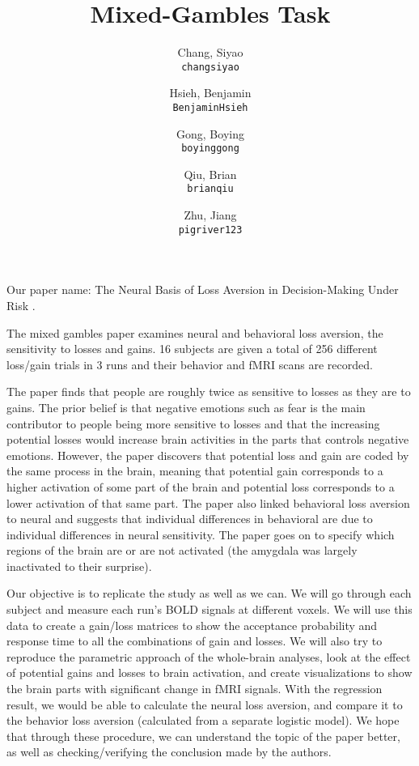 \documentclass[11pt]{article}
\title{Mixed-Gambles Task}
\author{

  Chang, Siyao\\
  \texttt{changsiyao}
  \and
  Hsieh, Benjamin\\
  \texttt{BenjaminHsieh}
  \and
  Gong, Boying\\
  \texttt{boyinggong}
  \and
  Qiu, Brian\\
  \texttt{brianqiu}
  \and
  Zhu, Jiang\\
  \texttt{pigriver123}
}
\begin{document}
\maketitle

Our paper name: The Neural Basis of Loss Aversion in Decision-Making Under Risk \cite{Tom2007LossAversion}.

The mixed gambles paper examines neural and behavioral loss aversion, the
sensitivity to losses and gains. 16 subjects are given a total of 256
different loss/gain trials in 3 runs and their behavior and fMRI scans are
recorded. 

The paper finds that people are roughly twice as sensitive to losses as they
are to gains. The prior belief is that negative emotions such as fear is the
main contributor to people being more sensitive to losses and that the
increasing potential losses would increase brain activities in the parts that
controls negative emotions. However, the paper discovers that potential loss
and gain are coded by the same process in the brain, meaning that potential
gain corresponds to a higher activation of some part of the brain and
potential loss corresponds to a lower activation of that same part. The paper
also linked behavioral loss aversion to neural and suggests that individual
differences in behavioral are due to individual differences in neural
sensitivity. The paper goes on to specify which regions of the brain are or
are not activated (the amygdala was largely inactivated to their surprise).

Our objective is to replicate the study as well as we can. We will go through
each subject and measure each run's BOLD signals at different voxels. We will
use this data to create a gain/loss matrices to show the acceptance
probability and response time to all the combinations of gain and losses. We
will also try to reproduce the parametric approach of the whole-brain
analyses, look at the effect of potential gains and losses to brain
activation, and create visualizations to show the brain parts with significant
change in fMRI signals. With the regression result, we would be able to
calculate the neural loss aversion, and compare it to the behavior loss
aversion (calculated from a separate logistic model). We hope that through
these procedure, we can understand the topic of the paper better, as well as
checking/verifying the conclusion made by the authors. 


\end{document}
